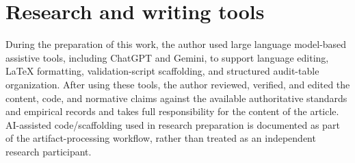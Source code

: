 \documentclass[12pt,a4paper]{article}
\begin{document}
\section*{Research and writing tools}
During the preparation of this work, the author used large language model-based assistive tools, including ChatGPT and Gemini, to support language editing, LaTeX formatting, validation-script scaffolding, and structured audit-table organization. After using these tools, the author reviewed, verified, and edited the content, code, and normative claims against the available authoritative standards and empirical records and takes full responsibility for the content of the article. AI-assisted code/scaffolding used in research preparation is documented as part of the artifact-processing workflow, rather than treated as an independent research participant.


\end{document}
